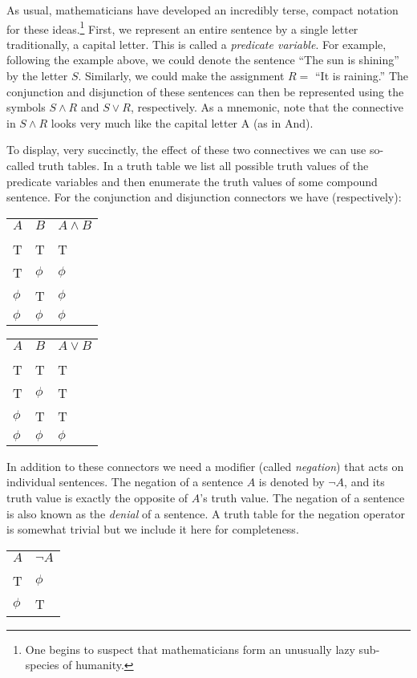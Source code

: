 \documentclass[10pt,]{book}
\theoremstyle{plain}
\theoremstyle{definition}
\theoremstyle{definition}
\numberwithin{equation}{section}
\newcommand{\hrulethin}  {\noalign{\hrule height 0.04em}}
\begin{document}
    As usual, mathematicians have developed an incredibly terse, compact
    notation for these ideas.\footnote{One begins to suspect that 
    mathematicians form an unusually lazy sub-species of humanity.\label{fn-12}}
    First, we represent an
    entire sentence by a single letter \textemdash{} traditionally, a capital letter.
    This is called a \emph{predicate variable}.
    For example, following the example above, we could denote the sentence
    ``The sun is shining'' by the letter \(S\). Similarly, we could make the
    assignment \(R =\) ``It is raining.'' The conjunction and disjunction
    of these sentences can then be represented using the symbols \(S \land R\)
    and \(S \lor R\), respectively. As a mnemonic, note that the connective
    in \(S \land R\) looks very much like the capital letter A (as in And).
\par

    To display, very succinctly, the effect of these two connectives we can
    use so-called truth tables. In a truth table we list
    all possible truth
    values of the predicate variables and then enumerate the truth values
    of some compound sentence. For the conjunction and disjunction
    connectors we have (respectively):
\begin{tabular}{lll}
\(A\)&\(B\)&\(A \land B\)\tabularnewline[0pt]
&&\tabularnewline\hrulethin
T&T&T\tabularnewline[0pt]
T&\(\phi\)&\(\phi\)\tabularnewline[0pt]
\(\phi\)&T&\(\phi\)\tabularnewline[0pt]
\(\phi\)&\(\phi\)&\(\phi\)
\end{tabular}
\begin{tabular}{lll}
\(A\)&\(B\)&\(A \lor B\)\tabularnewline[0pt]
&&\tabularnewline\hrulethin
T&T&T\tabularnewline[0pt]
T&\(\phi\)&T\tabularnewline[0pt]
\(\phi\)&T&T\tabularnewline[0pt]
\(\phi\)&\(\phi\)&\(\phi\)
\end{tabular}
\par

    In addition to these connectors we need a modifier (called
    \emph{negation})
    that acts on individual sentences. The negation of a sentence \(A\) is
    denoted by \({\lnot}A\), and its truth value is exactly the opposite of
    \(A\)'s truth value. The negation of a sentence is also known as the
    \emph{denial} of a sentence.
    A truth table for the negation operator is somewhat
    trivial but we include it here for completeness.
\begin{tabular}{ll}
\(A\)&\({\lnot}A\)\tabularnewline[0pt]
&\tabularnewline\hrulethin
T&\(\phi\)\tabularnewline[0pt]
\(\phi\)&T
\end{tabular}
\par
\end{document}
